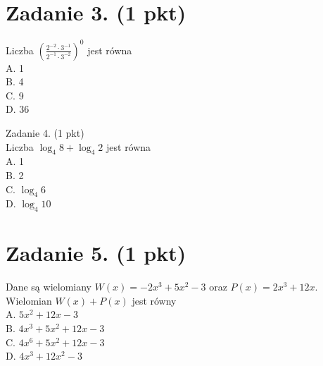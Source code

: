 \documentclass[10pt]{article}
\begin{document}
\section*{Zadanie 3. (1 pkt)}
Liczba \(\left(\frac{2^{-2} \cdot 3^{-1}}{2^{-1} \cdot 3^{-2}}\right)^{0}\) jest równa\\
A. 1\\
B. 4\\
C. 9\\
D. 36

Zadanie 4. (1 pkt)\\
Liczba \(\log _{4} 8+\log _{4} 2\) jest równa\\
A. 1\\
B. 2\\
C. \(\log _{4} 6\)\\
D. \(\log _{4} 10\)

\section*{Zadanie 5. (1 pkt)}
Dane są wielomiany \(W(x)=-2 x^{3}+5 x^{2}-3\) oraz \(P(x)=2 x^{3}+12 x\). Wielomian \(W(x)+P(x)\) jest równy\\
A. \(5 x^{2}+12 x-3\)\\
B. \(4 x^{3}+5 x^{2}+12 x-3\)\\
C. \(4 x^{6}+5 x^{2}+12 x-3\)\\
D. \(4 x^{3}+12 x^{2}-3\)
\end{document}
